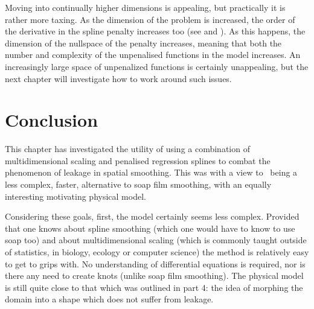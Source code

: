 Moving into continually higher dimensions is appealing, but practically it is rather more taxing. As the dimension of the problem is increased, the order of the derivative in the spline penalty increases too (see  and ). As this happens, the dimension of the nullspace of the penalty increases, meaning that both the number and complexity of the unpenalised functions in the model increases. An increasingly large space of unpenalized functions is certainly unappealing, but the next chapter will investigate how to work around such issues.

\section{Conclusion}
\label{mds-conc}

This chapter has investigated the utility of using a combination of multidimensional scaling and penalised regression splines to combat the phenomenon of leakage in spatial smoothing. This was with a view to \mdsap\ being a less complex, faster, alternative to soap film smoothing, with an equally interesting motivating physical model.

Considering these goals, first, the model certainly seems less complex. Provided that one knows about spline smoothing (which one would have to know to use soap too) and about multidimensional scaling (which is commonly taught outside of statistics, in biology, ecology or computer science) the method is relatively easy to get to grips with. No understanding of differential equations is required, nor is there any need to create knots (unlike soap film smoothing). The physical model is still quite close to that which was outlined in  part 4: the idea of morphing the domain into a shape which does not suffer from leakage.

